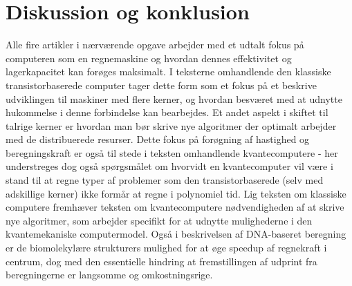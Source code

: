 \documentclass[10pt,a4paper]{article}
\begin{document}
\flushbottom
\section{Diskussion og konklusion}
Alle fire artikler i nærværende opgave arbejder med et udtalt fokus på
computeren som en regnemaskine og hvordan dennes effektivitet og lagerkapacitet kan 
forøges maksimalt. I teksterne omhandlende den klassiske transistorbaserede
computer tager dette form som et fokus på et beskrive udviklingen til maskiner
med flere kerner, og hvordan besværet med at udnytte hukommelse i denne forbindelse
kan bearbejdes. Et andet aspekt i skiftet til talrige kerner er hvordan man bør
skrive nye algoritmer der optimalt arbejder med de distribuerede resurser. 
Dette fokus på forøgning af hastighed og beregningskraft er også til stede i
teksten omhandlende kvantecomputere - her understreges dog også spørgsmålet om 
hvorvidt en kvantecomputer vil være i stand til at regne typer af problemer som 
den transistorbaserede (selv med adskillige kerner) ikke formår at regne i 
polynomiel tid. Lig teksten om klassiske computere fremhæver teksten om 
kvantecomputere nødvendigheden af at skrive nye algoritmer, som arbejder 
specifikt for at udnytte mulighederne i den kvantemekaniske computermodel. 
Også i beskrivelsen af DNA-baseret beregning er de biomolekylære strukturers
mulighed for at øge speedup af regnekraft i centrum, dog med den essentielle
hindring at fremstillingen af udprint fra beregningerne er langsomme og 
omkostningsrige. 
\end{document}
